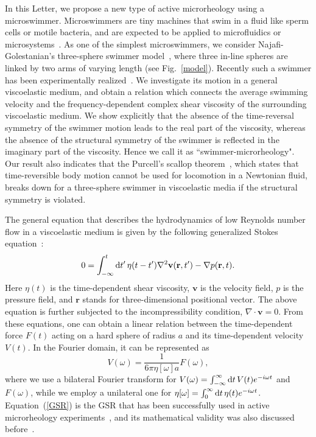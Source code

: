 \documentclass[nofootinbib,twocolumn,showpacs,preprintnumbers,pre,aps]{revtex4-1}
\begin{document}
In this Letter, we propose a new type of active microrheology using a microswimmer.
Microswimmers are tiny machines that swim in a fluid like sperm cells or motile bacteria, 
and are expected to be applied to microfluidics or 
microsystems~\cite{Lauga092}.
As one of the simplest microswimmers, we consider Najafi-Golestanian's 
three-sphere swimmer model~\cite{Golestanian04,Golestanian08}, where three in-line 
spheres are linked by two arms of varying length (see Fig.~\ref{model}).
Recently such a swimmer has been experimentally realized~\cite{Grosjean}.
We investigate its motion in a general viscoelastic medium, and obtain a relation which 
connects the average swimming velocity and the frequency-dependent complex 
shear viscosity of the surrounding viscoelastic medium.
We show explicitly that the absence of the time-reversal symmetry of the swimmer 
motion leads to the real part of the viscosity, whereas the absence of the structural 
symmetry of the swimmer is reflected in the imaginary part of the viscosity.
Hence we call it as ``swimmer-microrheology". 
Our result also indicates that the Purcell's scallop theorem~\cite{Purcell77,Lauga11}, 
which states that time-reversible body motion cannot be used for locomotion in a 
Newtonian fluid, breaks down 
for a three-sphere swimmer 
in viscoelastic media if the structural symmetry is violated. 


The general equation that describes the hydrodynamics  of low Reynolds number flow in  
a viscoelastic medium is given by the following generalized Stokes equation~\cite{Granek11}:
\begin{equation}
0=
\int_{-\infty}^t {\rm d}t'\,\eta(t-t') \nabla^2 \mathbf{v}(\mathbf{r},t') -\nabla p(\mathbf{r},t).
\label{StorksEve}
\end{equation}
Here $\eta(t)$ is the time-dependent shear viscosity, $\mathbf{v}$ is the velocity field, 
$p$ is the pressure field, and $\mathbf{r}$ stands for three-dimensional positional vector.
The above equation is further subjected to the incompressibility condition, 
$\nabla\cdot\mathbf{v}=0$.
From these equations, one can obtain a linear relation between the 
time-dependent force $F(t)$ acting on a hard sphere of radius $a$ and its 
time-dependent velocity $V(t)$.
In the Fourier domain, it can be represented as 
\begin{equation}
V(\omega)=\frac{1}{6\pi\eta[\omega] a}F(\omega),
\label{GSR}
\end{equation}
where we use a bilateral Fourier transform for 
$V(\omega)=\int_{-\infty}^{\infty} {\rm d}t\, V(t)e^{-i\omega t}$ and $F(\omega)$, 
while we employ a unilateral one for 
$\eta[\omega]=\int_{0}^{\infty} {\rm d}t\, \eta(t)e^{-i\omega t}$.
Equation~(\ref{GSR}) is the GSR that has been successfully used in active 
microrheology experiments~\cite{GSOMS}, and its mathematical validity was also 
discussed before~\cite{Schnurr97}.
\end{document}
